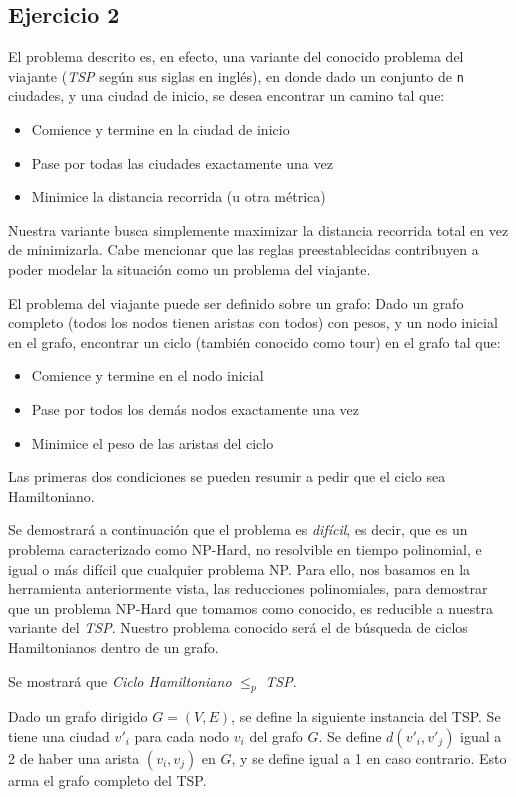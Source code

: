 \documentclass{article}
\begin{document}
\subsection{Ejercicio 2}
El problema descrito es, en efecto, una variante del conocido problema del viajante (\textit{TSP} según sus siglas en inglés), en donde dado un conjunto de \texttt{n} ciudades, y una ciudad de inicio, se desea encontrar un camino tal que:
\begin{itemize}
    \item Comience y termine en la ciudad de inicio
    \item Pase por todas las ciudades exactamente una vez
    \item Minimice la distancia recorrida (u otra métrica)
\end{itemize} 

Nuestra variante busca simplemente maximizar la distancia recorrida total en vez de minimizarla. Cabe mencionar que las reglas preestablecidas contribuyen a poder modelar la situación como un problema del viajante.

El problema del viajante puede ser definido sobre un grafo: Dado un grafo completo (todos los nodos tienen aristas con todos) con pesos, y un nodo inicial en el grafo, encontrar un ciclo (también conocido como tour) en el grafo tal que:
\begin{itemize}
    \item Comience y termine en el nodo inicial
    \item Pase por todos los demás nodos exactamente una vez
    \item Minimice el peso de las aristas del ciclo
\end{itemize}

Las primeras dos condiciones se pueden resumir a pedir que el ciclo sea Hamiltoniano.

Se demostrará a continuación que el problema es \textit{difícil}, es decir, que es un problema caracterizado como NP-Hard, no resolvible en tiempo polinomial, e igual o más difícil que cualquier problema NP. Para ello, nos basamos en la herramienta anteriormente vista, las reducciones polinomiales, para demostrar que un problema NP-Hard que tomamos como conocido, es reducible a nuestra variante del \textit{TSP}. Nuestro problema conocido será el de búsqueda de ciclos Hamiltonianos dentro de un grafo.

Se mostrará que \textit{Ciclo Hamiltoniano} $\leq _p$ \textit{TSP}. 

Dado un grafo dirigido $G=(V,E)$, se define la siguiente instancia del TSP. Se tiene una ciudad $v'_i$ para cada nodo $v_i$ del grafo $G$. Se define $d(v'_i, v'_j)$ igual a 2 de haber una arista $(v_i, v_j)$ en $G$, y se define igual a 1 en caso contrario. Esto arma el grafo completo del TSP.
\end{document}
